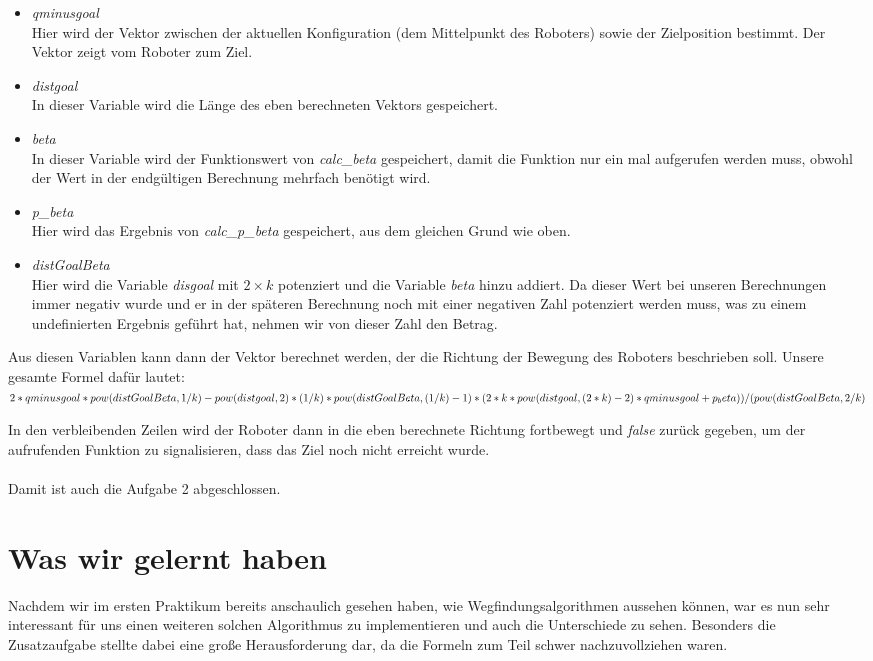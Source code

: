 \documentclass[a4paper]{scrartcl}
\begin{document}
\begin{itemize}
\begin{itemize}
\item \textit{qminusgoal}\\
Hier wird der Vektor zwischen der aktuellen Konfiguration (dem Mittelpunkt des Roboters) sowie der Zielposition bestimmt. Der Vektor zeigt vom Roboter zum Ziel.
\item \textit{distgoal}\\
In dieser Variable wird die Länge des eben berechneten Vektors gespeichert.
\item \textit{beta}\\
In dieser Variable wird der Funktionswert von \textit{calc\_beta} gespeichert, damit die Funktion nur ein mal aufgerufen werden muss, obwohl der Wert in der endgültigen Berechnung mehrfach benötigt wird.
\item \textit{p\_beta}\\
Hier wird das Ergebnis von \textit{calc\_p\_beta} gespeichert, aus dem gleichen Grund wie oben.
\item \textit{distGoalBeta}\\
Hier wird die Variable \textit{disgoal} mit $2\times k$ potenziert und die Variable \textit{beta} hinzu addiert. Da dieser Wert bei unseren Berechnungen immer negativ wurde und er in der späteren Berechnung noch mit einer negativen Zahl potenziert werden muss, was zu einem undefinierten Ergebnis geführt hat, nehmen wir von dieser Zahl den Betrag.
\end{itemize}
Aus diesen Variablen kann dann der Vektor berechnet werden, der die Richtung der Bewegung des Roboters beschrieben soll. Unsere gesamte Formel dafür lautet:\\
$2 * qminusgoal\\
			* pow(distGoalBeta, 1 / k)\\
			- pow(distgoal, 2)  * (1 / k) * pow(distGoalBeta, (1 / k) - 1)\\
			* (2 * k * pow(distgoal, (2 * k) - 2) * qminusgoal + p_beta)\\
		) / (\\
			pow(distGoalBeta, 2 / k)$

In den verbleibenden Zeilen wird der Roboter dann in die eben berechnete Richtung fortbewegt und \textit{false} zurück gegeben, um der aufrufenden Funktion zu signalisieren, dass das Ziel noch nicht erreicht wurde.\\\\

Damit ist auch die Aufgabe 2 abgeschlossen.
\end{itemize}

\section*{Was wir gelernt haben}

Nachdem wir im ersten Praktikum bereits anschaulich gesehen haben, wie Wegfindungsalgorithmen aussehen können, war es nun sehr interessant für uns einen weiteren solchen Algorithmus zu implementieren und auch die Unterschiede zu sehen. Besonders die Zusatzaufgabe stellte dabei eine große Herausforderung dar, da die Formeln zum Teil schwer nachzuvollziehen waren.
\end{document}

